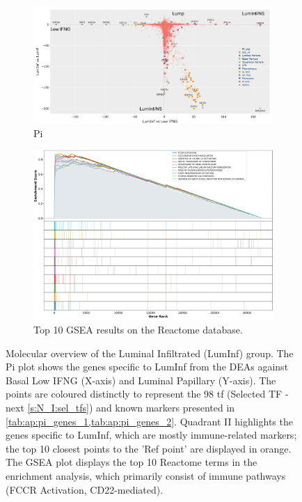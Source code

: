 \begin{figure}[H]
    \centering
    \captionsetup{font=small} 
    \begin{subfigure}[!t]{1.0\textwidth}
        \includegraphics[width=\textwidth,keepaspectratio]{Sections/ClusteringAnalysis/Resources/discussion/other_groups/lumInf_pi.png}
        \caption{Pi}
        \label{fig:cs:lumInf_pi}
    \end{subfigure}
    \centering
    \begin{subfigure}[!t]{0.9\textwidth}
        \includegraphics[width=\textwidth, keepaspectratio]{Sections/ClusteringAnalysis/Resources/discussion/other_groups/lumInf_reactome_10_top.png}
        \caption{Top 10 GSEA results on the Reactome database.}
        \label{fig:cs:lumInf_gsea}
    \end{subfigure} 
    \centering
    \caption[LumInf-like - molecular overview: GSEA and Pi-plot]{Molecular overview of the Luminal Infiltrated (LumInf) group. The Pi plot shows the genes specific to LumInf from the DEAs against Basal Low IFNG (X-axis) and Luminal Papillary (Y-axis). The points are coloured distinctly to represent the 98 \acrlong{tf} (Selected TF - next \cref{s:N_I:sel_tfs}) and known markers presented in \cref{tab:ap:pi_genes_1,tab:ap:pi_genes_2}. Quadrant II highlights the genes specific to LumInf, which are mostly immune-related markers; the top 10 closest points to the 'Ref point' are displayed in orange. The GSEA plot displays the top 10 Reactome terms in the enrichment analysis, which primarily consist of immune pathways (FCCR Activation, CD22-mediated).}
    \label{fig:cs:lumInf}
\end{figure}


